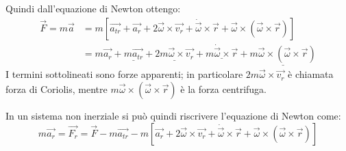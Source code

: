 \documentclass[../main.tex]{subfiles}
\begin{document}
Quindi dall'equazione di Newton ottengo:
\begin{equation*}
\begin{split}
	\overrightarrow{F}=m\overrightarrow{a}	& =m\left[\overrightarrow{a_{tr}}+\overrightarrow{a_r}+2\overrightarrow{\omega}\times\overrightarrow{v_r}+\dot{\overrightarrow{\omega}}\times\overrightarrow{r}+\overrightarrow{\omega}\times(\overrightarrow{\omega}\times\overrightarrow{r})\right]\\
											& =m\overrightarrow{a_r}+\underline{m\overrightarrow{a_{tr}}}+\underline{2m\overrightarrow{\omega}\times\overrightarrow{v_r}}+\underline{m\dot{\overrightarrow{\omega}}\times\overrightarrow{r}}+\underline{m\overrightarrow{\omega}\times(\overrightarrow{\omega}\times\overrightarrow{r})}
\end{split}
\end{equation*}
I termini sottolineati sono forze apparenti; in particolare $2m\overrightarrow{\omega}\times\overrightarrow{v_r}$
è chiamata forza di Coriolis, mentre $m\overrightarrow{\omega}\times(\overrightarrow{\omega}\times\overrightarrow{r})$
è la forza centrifuga.

In un sistema non inerziale si può quindi riscrivere l'equazione di Newton come:
\begin{equation}\label{ForzaNonInerziale}
	m\overrightarrow{a_r}=\overrightarrow{F_r}=\overrightarrow{F}-m\overrightarrow{a_{tr}}-m\left[\overrightarrow{a_r}+2\overrightarrow{\omega}\times\overrightarrow{v_r}+\dot{\overrightarrow{\omega}}\times\overrightarrow{r}+\overrightarrow{\omega}\times(\overrightarrow{\omega}\times\overrightarrow{r})\right]
\end{equation}
\end{document}
